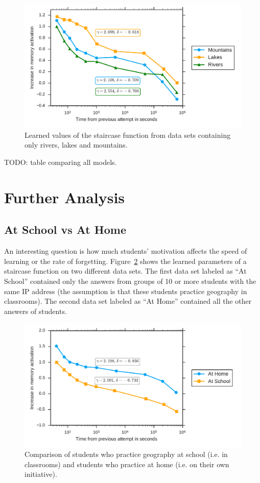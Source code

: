 \begin{figure}[htbp]
  \centering
  \includegraphics[width=\textwidth]{img/lakes-rivers-mountains}
  \caption{Learned values of the staircase function from data sets containing only rivers, lakes and mountains.}
  \label{fig:lakes-rivers-mountains}
\end{figure}

TODO: table comparing all models.

\section{Further Analysis}
\label{further-analysis}

\subsection{At School vs At Home}

An interesting question is how much students' motivation affects the speed of learning or the rate of forgetting. Figure~\ref{fig:at-home-vs-at-school} shows the learned parameters of a staircase function on two different data sets. The first data set labeled as ``At School'' contained only the answers from groups of 10 or more students with the same IP address (the assumption is that these students practice geography in classrooms). The second data set labeled as ``At Home'' contained all the other answers of students.

\begin{figure}[htbp]
  \centering
  \includegraphics[width=\textwidth]{img/at-home-vs-at-school}
  \caption{Comparison of students who practice geography at school (i.e. in classrooms) and students who practice at home (i.e. on their own initiative).}
  \label{fig:at-home-vs-at-school}
\end{figure}

